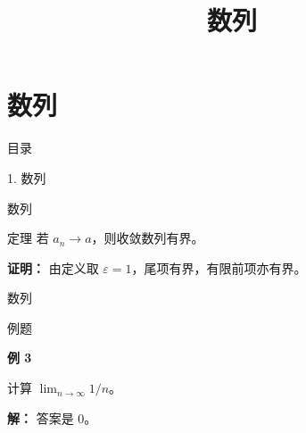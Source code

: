 \documentclass[aspectratio=169,10pt,fontset=fandol]{ctexbeamer}
\title{数列}
\begin{document}
\section{数列}
\begin{frame}[t,fragile]{目录}
\normalsize
{\color{blue}\normalsize 1. 数列\par}\vspace{0.3em}
\end{frame}
\begin{frame}[t,fragile]{数列}
\normalsize
\begin{block}{定理}
{\normalsize
若 $a_n\to a$，则收敛数列有界。
}
\end{block}
\pause
{\normalsize
\textbf{证明：}
由定义取 $\varepsilon=1$，尾项有界，有限前项亦有界。
}
\end{frame}
\begin{frame}[t,fragile]{数列}
\normalsize
\begin{block}{例题}
{\normalsize
\textbf{例 3}\par
计算 $\lim_{n\to\infty}1/n$。
}
\end{block}
\pause
{\normalsize
\textbf{解：}
答案是 $0$。
}
\end{frame}
\end{document}
